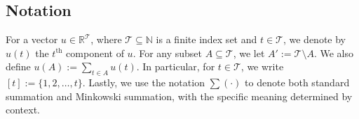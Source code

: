  \subsection*{Notation}\label{subsection:notation}
 \noindent
 For a vector $ u \in \mathbb{R}^{\mathcal{T}} $, where $ \mathcal{T} \subseteq \mathbb{N} $ is a finite index set and $ t \in \mathcal{T} $, we denote by $ u(t) $ the $ t^{\text{th}} $ component of $ u $.
 For any subset $ A \subseteq \mathcal{T} $,  we let $A' := \mathcal{T}\setminus A$.
 We also define $ u(A) := \sum_{t \in A} u(t) $.
 In particular, for $ t \in \mathcal{T} $, we write $ [t] := \{1, 2, \ldots, t\} $.
 Lastly, we use the notation $ \sum(\cdot) $ to denote both standard summation and Minkowski summation, with the specific meaning determined by context.

